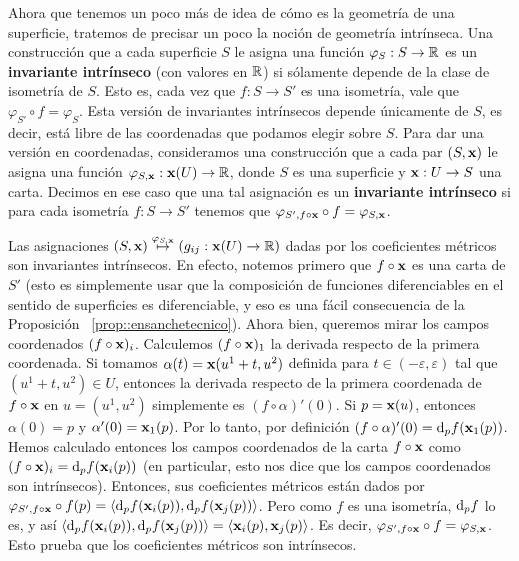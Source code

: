 Ahora que tenemos un poco más de idea de cómo es la geometría de una superficie, tratemos de precisar un poco la noción de geometría intrínseca. Una construcción que a cada superficie $S$ le asigna una función $\varphi_S:S\to\mathbb{R}$ es un \textbf{invariante intrínseco} (con valores en $\mathbb{R}$) si sólamente depende de la clase de isometría de $S$. Esto es, cada vez que $f:S\to S'$ es una isometría, vale que $\varphi_{S'}\circ f = \varphi_S$. Esta versión de invariantes intrínsecos depende únicamente de $S$, es decir, está libre de las coordenadas que podamos elegir sobre $S$. Para dar una versión en coordenadas, consideramos una construcción que a cada par $(S,\operatorname{\mathbf{x}})$ le asigna una función $\varphi_{S,\operatorname{\mathbf{x}}}:\operatorname{\mathbf{x}}(U)\to\mathbb{R}$, donde $S$ es una superficie y $\operatorname{\mathbf{x}}:U\to S$ una carta. Decimos en ese caso que una tal asignación es un \textbf{invariante intrínseco} si para cada isometría $f:S\to S'$ tenemos que $\varphi_{S',f\circ\operatorname{\mathbf{x}}}\circ f = \varphi_{S,\operatorname{\mathbf{x}}}$.

\begin{obs}
Las asignaciones $(S,\operatorname{\mathbf{x}})\stackrel{\varphi_{S,\operatorname{\mathbf{x}}}}{\mapsto} (g_{ij}:\operatorname{\mathbf{x}}(U)\to\mathbb{R})$ dadas por los coeficientes métricos son invariantes intrínsecos. En efecto, notemos primero que $f\circ\operatorname{\mathbf{x}}$ es una carta de $S'$ (esto es simplemente usar que la composición de funciones diferenciables en el sentido de superficies es diferenciable, y eso es una fácil consecuencia de la Proposición ~\ref{prop::ensanchetecnico}). Ahora bien, queremos mirar los campos coordenados $(f\circ\operatorname{\mathbf{x}})_i$. Calculemos $(f\circ\operatorname{\mathbf{x}})_1$ la derivada respecto de la primera coordenada. Si tomamos $\alpha(t)=\operatorname{\mathbf{x}}(u^1 +t,u^2)$ definida para $t\in(-\varepsilon,\varepsilon)$ tal que $(u^1+t,u^2)\in U$, entonces la derivada respecto de la primera coordenada de $f\circ\operatorname{\mathbf{x}}$ en $u=(u^1,u^2)$ simplemente es $(f\circ\alpha)'(0)$. Si $p=\operatorname{\mathbf{x}}(u)$, entonces $\alpha(0)=p$ y $\alpha'(0)=\operatorname{\mathbf{x}}_1(p)$. Por lo tanto, por definición $(f\circ\alpha)'(0)=\mathop{}\!\mathrm{d}_p f(\operatorname{\mathbf{x}}_1(p))$. Hemos calculado entonces los campos coordenados de la carta $f\circ\operatorname{\mathbf{x}}$ como $(f\circ\operatorname{\mathbf{x}})_i=\mathop{}\!\mathrm{d}_p f(\operatorname{\mathbf{x}}_i(p))$ (en particular, esto nos dice que los campos coordenados son intrínsecos). Entonces, sus coeficientes métricos están dados por $\varphi_{S',f\circ\operatorname{\mathbf{x}}}\circ f(p)=\left\langle \mathop{}\!\mathrm{d}_p f(\operatorname{\mathbf{x}}_i(p)),\mathop{}\!\mathrm{d}_p f(\operatorname{\mathbf{x}}_j(p)) \right\rangle$. Pero como $f$ es una isometría, $\mathop{}\!\mathrm{d}_p f$ lo es, y así $\left\langle \mathop{}\!\mathrm{d}_p f(\operatorname{\mathbf{x}}_i(p)),\mathop{}\!\mathrm{d}_p f(\operatorname{\mathbf{x}}_j(p)) \right\rangle = \left\langle \operatorname{\mathbf{x}}_i(p),\operatorname{\mathbf{x}}_j(p) \right\rangle$. Es decir, $\varphi_{S',f\circ\operatorname{\mathbf{x}}}\circ f = \varphi_{S,\operatorname{\mathbf{x}}}$. Esto prueba que los coeficientes métricos son intrínsecos.
\end{obs}


